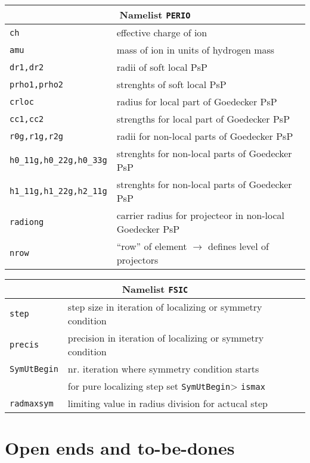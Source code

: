 \documentclass[12pt]{article}
\begin{document}
\begin{tabular}{ll}
\hline
\multicolumn{2}{c}{Namelist {\tt PERIO}} in {\tt for005.<name>} \\
\hline
{\tt ch}& effective charge of ion \\
{\tt amu}& mass of ion in units of hydrogen mass\\
{\tt dr1,dr2}& radii of soft local PsP\\
{\tt prho1,prho2}& strenghts of soft local PsP\\
{\tt crloc}& radius for local part of Goedecker PsP\\
{\tt cc1,cc2}& strengths for local part of  Goedecker PsP\\
{\tt r0g,r1g,r2g}& radii for non-local parts of  Goedecker PsP\\
{\tt h0\_11g,h0\_22g,h0\_33g}& 
  strenghts for non-local parts of  Goedecker PsP\\
{\tt h1\_11g,h1\_22g,h2\_11g}&
  strenghts for non-local parts of  Goedecker PsP\\
{\tt radiong}& carrier radius for projecteor in non-local Goedecker PsP\\
{\tt nrow}& 
  ``row'' of element $\longrightarrow$ defines level  of projectors\\ 
\hline
\end{tabular}


\begin{tabular}{ll}
\hline
\multicolumn{2}{c}{Namelist {\tt FSIC}} in {\tt for005.<name>} \\
\hline
{\tt step}& step size in iteration of localizing or symmetry condition \\
{\tt precis}& precision in iteration of localizing or symmetry condition \\
{\tt SymUtBegin}& nr. iteration where symmetry condition starts\\
 &               for pure localizing step set {\tt  SymUtBegin}> {\tt ismax}\\
{\tt radmaxsym}& limiting value in radius division  for actucal step\\
\hline
\end{tabular}

\newpage

\appendix
\section{Open ends and to-be-dones}
\end{document}
